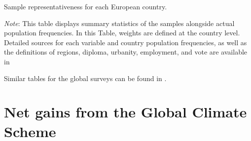 \begin{table}[h]
    \caption{Sample representativeness for each European country.} \label{tab:representativeness_EU}
    \makebox[\textwidth][c]{
        \resizebox*{!}{.50\textheight}{%
        
        }
    }
    {\footnotesize \textit{Note}: This table displays summary statistics of the samples alongside actual population frequencies. In this Table, weights are defined at the country level.  %
    Detailed sources for each variable and country population frequencies, as well as the definitions of regions, diploma, urbanity, employment, and vote are available in %
    }
\end{table}

Similar tables for the global surveys can be found in \citet{dechezlepretre_fighting_2022}.

\clearpage
\section{Net gains from the Global Climate Scheme}\label{app:gain_gcs}

